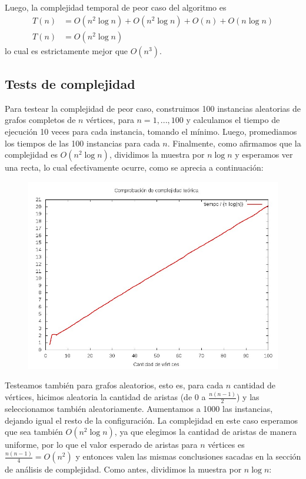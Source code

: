 Luego, la complejidad temporal de peor caso del algoritmo es 
\begin{align*}
T(n) &= O(n^2 \log n) + O(n^2 \log n) + O(n) + O(n \log n) \\
T(n) &= O(n^2 \log n)
\end{align*}
lo cual es estrictamente mejor que $O(n^3)$.

\subsection{Tests de complejidad}

Para testear la complejidad de peor caso, construimos 100 instancias aleatorias de grafos completos de $n$ vértices, para $n = {1, ... , 100}$ y calculamos el tiempo de ejecución 10 veces para cada instancia, tomando el mínimo. Luego, promediamos los tiempos de las 100 instancias para cada $n$. Finalmente, como afirmamos que la complejidad es $O(n^2 \log n)$, dividimos la muestra por $n \log n$ y esperamos ver una recta, lo cual efectivamente ocurre, como se aprecia a continuación:

\begin{figure}[H]
	\begin{minipage}[t]{\linewidth}
		\centering
		\includegraphics[width=\textwidth]{p3_complejidad_grafos_completos.jpg}
		\label{fig:p3_complejidad_grafos_completos}
	\end{minipage}
\end{figure}

Testeamos también para grafos aleatorios, esto es, para cada $n$ cantidad de vértices, hicimos aleatoria la cantidad de aristas (de $0$ a $\frac{n(n-1)}{2}$) y las seleccionamos también aleatoriamente. Aumentamos a 1000 las instancias, dejando igual el resto de la configuración. La complejidad en este caso esperamos que sea también $O(n^2 \log n)$, ya que elegimos la cantidad de aristas de manera uniforme, por lo que el valor esperado de aristas para $n$ vértices es $\frac{n(n-1)}{4} = O(n^2)$ y entonces valen las mismas conclusiones sacadas en la sección de análisis de complejidad. Como antes, dividimos la muestra por $n \log n$:

